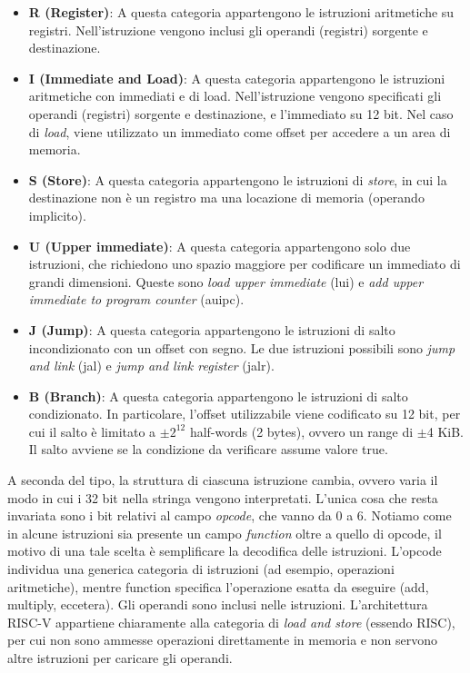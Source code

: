 \begin{itemize}
	\item \textbf{R (Register)}: A questa categoria appartengono le istruzioni aritmetiche su registri. Nell'istruzione vengono inclusi gli operandi (registri) sorgente e destinazione.
	\item \textbf{I (Immediate and Load)}: A questa categoria appartengono le istruzioni aritmetiche con immediati e di load. Nell'istruzione vengono specificati gli operandi (registri) sorgente e destinazione, e l'immediato su 12 bit. Nel caso di \textit{load}, viene utilizzato un immediato come offset per accedere a un area di memoria.
	\item \textbf{S (Store)}: A questa categoria appartengono le istruzioni di \textit{store}, in cui la destinazione non è un registro ma una locazione di memoria (operando implicito).
	\item \textbf{U (Upper immediate)}: A questa categoria appartengono solo due istruzioni, che richiedono uno spazio maggiore per codificare un immediato di grandi dimensioni. Queste sono \textit{load upper immediate} (lui) e \textit{add upper immediate to program counter} (auipc).
	\item \textbf{J (Jump)}: A questa categoria appartengono le istruzioni di salto incondizionato con un offset con segno. Le due istruzioni possibili sono \textit{jump and link} (jal) e \textit{jump and link register} (jalr).
	\item \textbf{B (Branch)}: A questa categoria appartengono le istruzioni di salto condizionato. In particolare, l'offset utilizzabile viene codificato su 12 bit, per cui il salto è limitato a \(\pm2^{12}\) half-words (2 bytes), ovvero un range di \(\pm\)4 KiB. Il salto avviene se la condizione da verificare assume valore true.
\end{itemize}
A seconda del tipo, la struttura di ciascuna istruzione cambia, ovvero varia il modo in cui i 32 bit nella stringa vengono interpretati. L'unica cosa che resta invariata sono i bit relativi al campo \textit{opcode}, che vanno da 0 a 6. Notiamo come in alcune istruzioni sia presente un campo \textit{function} oltre a quello di opcode, il motivo di una tale scelta è semplificare la decodifica delle istruzioni. L'opcode individua una generica categoria di istruzioni (ad esempio, operazioni aritmetiche), mentre function specifica l'operazione esatta da eseguire (add, multiply, eccetera).
Gli operandi sono inclusi nelle istruzioni. L'architettura RISC-V appartiene chiaramente alla categoria di \textit{load and store} (essendo RISC), per cui non sono ammesse operazioni direttamente in memoria e non servono altre istruzioni per caricare gli operandi.

